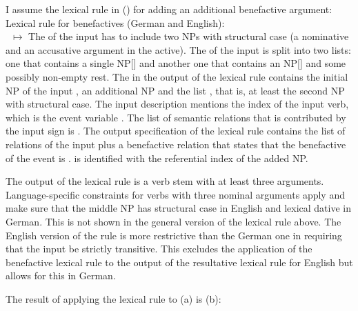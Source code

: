 I assume the lexical rule in () for adding an additional benefactive argument:
\eas
Lexical rule for benefactives (German and English):\\
~$\mapsto$
%
\zs
The \argstl of the input has to include two NPs with structural case (a nominative and an accusative
argument in the active). The \argstl of the input is split into two lists: one that contains a
single NP[\str] and another one that contains an NP[\str] and some possibly non-empty rest. The
\argst in the output of the lexical rule contains the initial NP of the input , an
additional NP and the list , that is, at least the second NP with structural case.
The input description mentions the index of the input verb, which is the event variable
. The list of semantic relations that is contributed by the input sign is . The
output specification of the lexical rule contains the list of relations of the input plus a
benefactive relation that states that the benefactive of the event  is .  is
identified with the referential index of the added NP.

The output of the lexical rule is a verb stem with at least three arguments. Language-specific
constraints for verbs with three nominal arguments apply and make sure that the middle NP has
structural case in English and lexical dative in German. This is not shown in the general version of
the lexical rule above. The English version of the rule is more restrictive than the German one in
requiring that the input be strictly transitive. This excludes the application of the benefactive
lexical rule to the output of the resultative lexical rule for English but allows for this in German.

The result of applying the lexical rule to (a) is (b):

